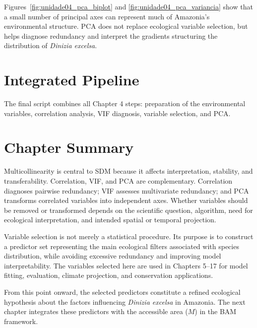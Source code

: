 \begin{aplicacao}
Figures~\ref{fig:unidade04_pca_biplot} and
\ref{fig:unidade04_pca_variancia} show that a small number of principal axes can
represent much of Amazonia's environmental structure. PCA does not replace
ecological variable selection, but helps diagnose redundancy and interpret the
gradients structuring the distribution of \textit{Dinizia excelsa}.
\end{aplicacao}

\section{Integrated Pipeline}

The final script combines all Chapter 4 steps: preparation of the environmental
variables, correlation analysis, VIF diagnosis, variable selection, and PCA.


\section{Chapter Summary}

Multicollinearity is central to SDM because it affects interpretation,
stability, and transferability. Correlation, VIF, and PCA are complementary.
Correlation diagnoses pairwise redundancy; VIF assesses multivariate
redundancy; and PCA transforms correlated variables into independent axes.
Whether variables should be removed or transformed depends on the scientific
question, algorithm, need for ecological interpretation, and intended spatial
or temporal projection.

\begin{conceito}[title={\faBook\quad Key message from Chapter 4}]
Variable selection is not merely a statistical procedure. Its purpose is to
construct a predictor set representing the main ecological filters associated
with species distribution, while avoiding excessive redundancy and improving
model interpretability. The variables selected here are used in Chapters 5--17
for model fitting, evaluation, climate projection, and conservation applications.
\end{conceito}

\begin{aplicacao}
From this point onward, the selected predictors constitute a refined ecological
hypothesis about the factors influencing \textit{Dinizia excelsa} in Amazonia.
The next chapter integrates these predictors with the accessible area ($M$) in
the BAM framework.
\end{aplicacao}

